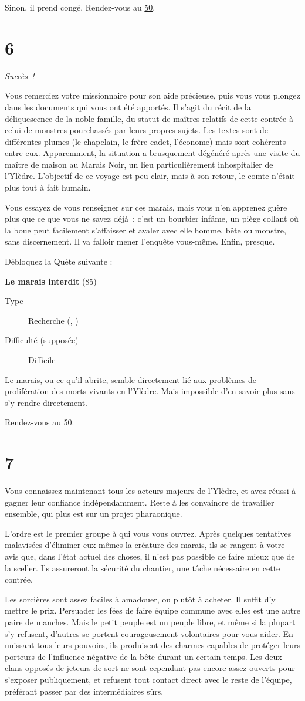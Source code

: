 \documentclass{report}
\newcommand{\gsection}[1]{
    \section{#1}
    \label{section-#1}
}
\newcommand{\glink}[1]{\hyperref[section-#1]{#1}}
\newcommand{\quest}[5]{
    \begin{mdframed}[innertopmargin=0.5cm,innerbottommargin=0.5cm]
        \begin{center}
            \textbf{#1} (#2)
        \end{center}
        \begin{description}
            \item[Type] #3
            \item[Difficulté (supposée)] #4
        \end{description}
        #5
    \end{mdframed}
}
\newcommand{\success}{
    \emph{Succès !}
}
\begin{document}
Sinon, il prend congé. Rendez-vous au \glink{50}.

\gsection{6}

\success

Vous remerciez votre missionnaire pour son aide précieuse, puis vous vous plongez dans les documents qui vous ont été apportés. Il s'agit du récit de la déliquescence de la noble famille, du statut de maîtres relatifs de cette contrée à celui de monstres pourchassés par leurs propres sujets. Les textes sont de différentes plumes (le chapelain, le frère cadet, l'économe) mais sont cohérents entre eux. Apparemment, la situation a brusquement dégénéré après une visite du maître de maison au Marais Noir, un lieu particulièrement inhospitalier de l'Ylèdre. L'objectif de ce voyage est peu clair, mais à son retour, le comte n'était plus tout à fait humain.

Vous essayez de vous renseigner sur ces marais, mais vous n'en apprenez guère plus que ce que vous ne savez déjà : c'est un bourbier infâme, un piège collant où la boue peut facilement s'affaisser et avaler avec elle homme, bête ou monstre, sans discernement. Il va falloir mener l'enquête vous-même. Enfin, presque.

Débloquez la Quête suivante :

\quest{Le marais interdit}{85}{Recherche (\ankh, \caduceus)}{Difficile}{
Le marais, ou ce qu'il abrite, semble directement lié aux problèmes de prolifération des morts-vivants en l'Ylèdre. Mais impossible d'en savoir plus sans s'y rendre directement.
}

Rendez-vous au \glink{50}.

\gsection{7}

Vous connaissez maintenant tous les acteurs majeurs de l'Ylèdre, et avez réussi à gagner leur confiance indépendamment. Reste à les convaincre de travailler ensemble, qui plus est sur un projet pharaonique.

L'ordre est le premier groupe à qui vous vous ouvrez. Après quelques tentatives malavisées d'éliminer eux-mêmes la créature des marais, ils se rangent à votre avis que, dans l'état actuel des choses, il n'est pas possible de faire mieux que de la sceller. Ils assureront la sécurité du chantier, une tâche nécessaire en cette contrée.

Les sorcières sont assez faciles à amadouer, ou plutôt à acheter. Il suffit d'y mettre le prix. Persuader les fées de faire équipe commune avec elles est une autre paire de manches. Mais le petit peuple est un peuple libre, et même si la plupart s'y refusent, d'autres se portent courageusement volontaires pour vous aider. En unissant tous leurs pouvoirs, ils produisent des charmes capables de protéger leurs porteurs de l'influence négative de la bête durant un certain temps. Les deux clans opposés de jeteurs de sort ne sont cependant pas encore assez ouverts pour s'exposer publiquement, et refusent tout contact direct avec le reste de l'équipe, préférant passer par des intermédiaires sûrs.
\end{document}
